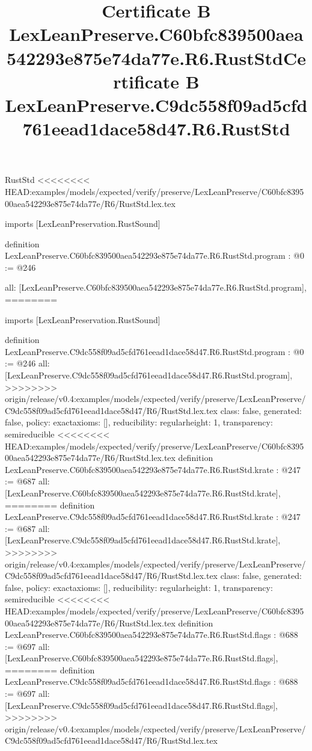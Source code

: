 \begin{lexlean}{RustStd}
<<<<<<<< HEAD:examples/models/expected/verify/preserve/LexLeanPreserve/C60bfc839500aea542293e875e74da77e/R6/RustStd.lex.tex
\title{Certificate B LexLeanPreserve.C60bfc839500aea542293e875e74da77e.R6.RustStd}
\begin{coremodule}
imports [LexLeanPreservation.RustSound]

definition LexLeanPreserve.C60bfc839500aea542293e875e74da77e.R6.RustStd.program : @0 := @246 {
  all: [LexLeanPreserve.C60bfc839500aea542293e875e74da77e.R6.RustStd.program],
========
\title{Certificate B LexLeanPreserve.C9dc558f09ad5cfd761eead1dace58d47.R6.RustStd}
\begin{coremodule}
imports [LexLeanPreservation.RustSound]

definition LexLeanPreserve.C9dc558f09ad5cfd761eead1dace58d47.R6.RustStd.program : @0 := @246 {
  all: [LexLeanPreserve.C9dc558f09ad5cfd761eead1dace58d47.R6.RustStd.program],
>>>>>>>> origin/release/v0.4:examples/models/expected/verify/preserve/LexLeanPreserve/C9dc558f09ad5cfd761eead1dace58d47/R6/RustStd.lex.tex
  class: false,
  generated: false,
  policy: exact{axioms: []},
  reducibility: regular{height: 1},
  transparency: semireducible
}
<<<<<<<< HEAD:examples/models/expected/verify/preserve/LexLeanPreserve/C60bfc839500aea542293e875e74da77e/R6/RustStd.lex.tex
definition LexLeanPreserve.C60bfc839500aea542293e875e74da77e.R6.RustStd.krate : @247 := @687 {
  all: [LexLeanPreserve.C60bfc839500aea542293e875e74da77e.R6.RustStd.krate],
========
definition LexLeanPreserve.C9dc558f09ad5cfd761eead1dace58d47.R6.RustStd.krate : @247 := @687 {
  all: [LexLeanPreserve.C9dc558f09ad5cfd761eead1dace58d47.R6.RustStd.krate],
>>>>>>>> origin/release/v0.4:examples/models/expected/verify/preserve/LexLeanPreserve/C9dc558f09ad5cfd761eead1dace58d47/R6/RustStd.lex.tex
  class: false,
  generated: false,
  policy: exact{axioms: []},
  reducibility: regular{height: 1},
  transparency: semireducible
}
<<<<<<<< HEAD:examples/models/expected/verify/preserve/LexLeanPreserve/C60bfc839500aea542293e875e74da77e/R6/RustStd.lex.tex
definition LexLeanPreserve.C60bfc839500aea542293e875e74da77e.R6.RustStd.flags : @688 := @697 {
  all: [LexLeanPreserve.C60bfc839500aea542293e875e74da77e.R6.RustStd.flags],
========
definition LexLeanPreserve.C9dc558f09ad5cfd761eead1dace58d47.R6.RustStd.flags : @688 := @697 {
  all: [LexLeanPreserve.C9dc558f09ad5cfd761eead1dace58d47.R6.RustStd.flags],
>>>>>>>> origin/release/v0.4:examples/models/expected/verify/preserve/LexLeanPreserve/C9dc558f09ad5cfd761eead1dace58d47/R6/RustStd.lex.tex
}}}
\end{coremodule}}
\end{coremodule}
\end{lexlean}
